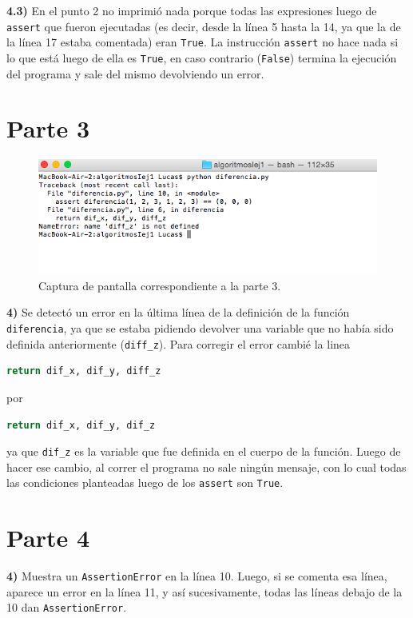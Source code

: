 \documentclass{article}
\begin{document}
\noindent
\textbf{4.3)} En el punto 2 no imprimi\'o nada porque todas las expresiones luego de \texttt{assert} que fueron ejecutadas (es decir, desde la l\'inea 5 hasta la 14, ya que la de la l\'inea 17 estaba comentada) eran \texttt{True}. La instrucci\'on \texttt{assert} no hace nada si lo que est\'a luego de ella es \texttt{True}, en caso contrario (\texttt{False}) termina la ejecuci\'on del programa y sale del mismo devolviendo un error.

\section*{Parte 3}
\begin{figure}[H]
    \centering
    \includegraphics[width=1\textwidth]{parte-3.png}
    \caption{Captura de pantalla correspondiente a la parte 3.}
    \label{fig:captura-3}
\end{figure}

\noindent
\textbf{4)} Se detect\'o un error en la \'ultima l\'inea de la definici\'on de la funci\'on \texttt{diferencia}, ya que se estaba pidiendo devolver una variable que no hab\'ia sido definida anteriormente (\texttt{diff\_z}). Para corregir el error cambi\'e la linea
\begin{lstlisting}[language=Python]
    return dif_x, dif_y, diff_z
\end{lstlisting}
por
\begin{lstlisting}[language=Python]
    return dif_x, dif_y, dif_z
\end{lstlisting}
ya que \texttt{dif\_z} es la variable que fue definida en el cuerpo de la funci\'on. Luego de hacer ese cambio, al correr el programa no sale ning\'un mensaje, con lo cual todas las condiciones planteadas luego de los \texttt{assert} son \texttt{True}.

\section*{Parte 4}

\textbf{4)} Muestra un \texttt{AssertionError} en la l\'inea 10. Luego, si se comenta esa l\'inea, aparece un error en la l\'inea 11, y as\'i sucesivamente, todas las l\'ineas debajo de la 10 dan \texttt{AssertionError}.\\
\end{document}
